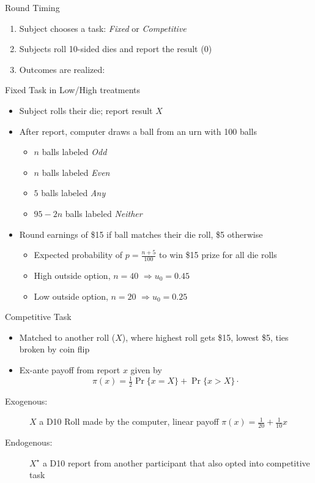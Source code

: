 \documentclass{beamer}
\begin{document}
\begin{frame}{Round Timing}
    \begin{enumerate}
        \item Subject chooses a task: \emph{Fixed} or \emph{Competitive}
        \item Subjects roll 10-sided dies and report the result (0)
        \item Outcomes are realized:
    \end{enumerate}
\end{frame}

\begin{frame}{Fixed Task in Low/High treatments}
    \begin{itemize}
        \item Subject rolls their die; report result $X$
        \item After report, computer draws a ball from an urn with 100 balls
            \begin{itemize}
                \item $n$ balls labeled \emph{Odd}
                \item $n$ balls labeled \emph{Even}
                \item $5$ balls labeled \emph{Any}
                \item $95-2n$ balls labeled \emph{Neither}
            \end{itemize}
        \item Round earnings of \$15 if ball matches their die roll, \$5 otherwise
            \begin{itemize}
                \item Expected probability of $p=\frac{n+5}{100}$ to win \$15 prize for
                all die rolls
                \item High outside option, $n=40$ $\Rightarrow u_{0}=0.45$
                \item Low outside option, $n=20$ $\Rightarrow u_{0}=0.25$
            \end{itemize}
    \end{itemize}
\end{frame}

\begin{frame}{Competitive Task}
    \begin{itemize}
        \item Matched to another roll ($X$), where highest roll gets \$15, lowest
        \$5, ties broken by coin flip
        \item Ex-ante payoff from report $x$ given by 
        \[
        \pi(x)=\tfrac{1}{2}\Pr\{x=X\}+\Pr\{x>X\}\cdot
        \]
    \end{itemize}
    \begin{description}
        \item [{Exogenous:}] $X$ a D10 Roll made by the computer, linear payoff
        $\pi(x)=\tfrac{1}{20}+\tfrac{1}{10}x$
        \item [{Endogenous:}] $X^{\star}$ a D10 report from another participant
        that also opted into competitive task
    \end{description}
\end{frame}
\end{document}
